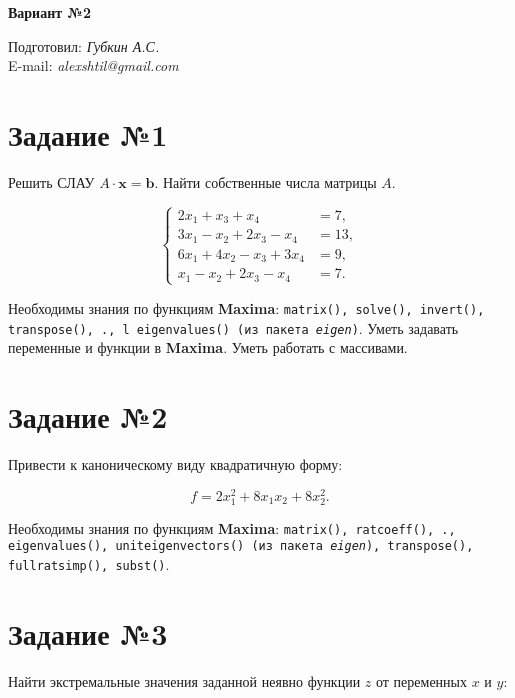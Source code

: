 \begin{center}
    \textbf{\huge Вариант №2}
\end{center}

\begin{flushright}
    Подготовил: \textit{Губкин А.С.}\\
    E-mail: \textit{alexshtil@gmail.com}\\
\end{flushright}

\section*{Задание №1}

    Решить СЛАУ $A \cdot \mathbf{x} = \mathbf{b}$. Найти собственные числа матрицы $A$.

    \[
        \left\{
            \begin{aligned}
                2 x_{1} + x_{3} + x_{4} &= 7,\\
                3 x_{1} - x_{2} + 2 x_{3} - x_{4} &= 13,\\
                6 x_{1} + 4 x_{2} - x_{3} + 3 x_{4} &= 9,\\
                x_{1} - x_{2} + 2 x_{3} - x_{4} &= 7.
            \end{aligned}
        \right.
    \]

    Необходимы знания по функциям \textbf{Maxima}: {\tt matrix(), solve(), invert(), transpose(), ., ^^, eigenvalues() (из пакета \textit{eigen})}. Уметь задавать переменные и функции в \textbf{Maxima}. Уметь работать с массивами.

\section*{Задание №2}

    Привести к каноническому виду квадратичную форму: 

    \[
        f = 2 x^{2}_{1} + 8 x_{1} x_{2} + 8 x^{2}_{2}.
    \]

    Необходимы знания по функциям \textbf{Maxima}: {\tt matrix(), ratcoeff(), ., eigenvalues(), uniteigenvectors() (из пакета \textit{eigen}), transpose(), fullratsimp(), subst()}.

\section*{Задание №3}

    Найти экстремальные значения заданной неявно функции $z$ от переменных $x$ и $y$:

